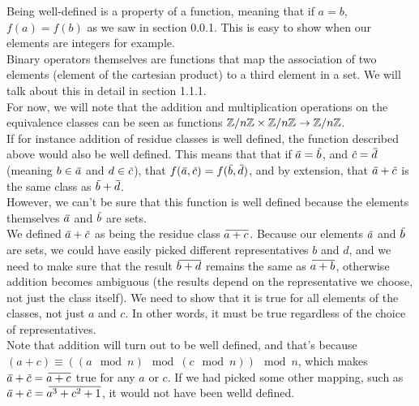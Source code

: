 \documentclass[12pt]{article}
\begin{document}
    Being well-defined is a property of a function,
    meaning that if $a = b$, $f(a) = f(b)$
    as we saw in section 0.0.1.
    This is easy to show when our elements are integers for example. \\
    Binary operators themselves are functions that
    map the association of two elements
    (element of the cartesian product) to a third element in a set.
    We will talk about this in detail in section 1.1.1. \\
    For now, we will note that the addition and multiplication
    operations on the equivalence classes can be seen as
    functions $\mathbb{Z}/n\mathbb{Z} \times \mathbb{Z}/n\mathbb{Z} \to \mathbb{Z}/n\mathbb{Z}$. \\
    If for instance addition of residue classes is well defined,
    the function described above would also be well defined.
    This means that that if $\,\overline{\!{a}} = \,\overline{\!{b}}$,
    and $\,\overline{\!{c}} = \,\overline{\!{d}}$
    (meaning $b \in \,\overline{\!{a}}$ and $d \in \,\overline{\!{c}}$),
    that $f(\,\overline{\!{a}}, \,\overline{\!{c}}) = f(\,\overline{\!{b}}, \,\overline{\!{d}})$,
    and by extension, that $\,\overline{\!{a}} + \,\overline{\!{c}}$
    is the same class as $\,\overline{\!{b}} + \,\overline{\!{d}}$. \\
    However, we can't be sure that this function is well defined
    because the elements themselves
    $\,\overline{\!{a}}$ and $\,\overline{\!{b}}$ are sets. \\
    We defined $\,\overline{\!{a}} + \,\overline{\!{c}}$
    as being the residue class $\,\overline{\!{a + c}}$.
    Because our elements $\,\overline{\!{a}}$ and $\,\overline{\!{b}}$ are sets,
    we could have easily picked different representatives
    $b$ and $d$,
    and we need to make sure that the result $\,\overline{\!{b + d}}$
    remains the same as $\,\overline{\!{a+b}}$,
    otherwise addition becomes ambiguous
    (the results depend on the representative we choose,
    not just the class itself).
    We need to show that it is true for all elements of the classes,
    not just $a$ and $c$.
    In other words, it must be true regardless
    of the choice of representatives. \\
    Note that addition will turn out to be well defined,
    and that's because
    $(a + c) \equiv ((a \mod n) \mod (c \mod n)) \mod n$,
    which makes $\,\overline{\!{a}} + \,\overline{\!{c}} = \,\overline{\!{a + c}}$
    true for any $a$ or $c$.
    If we had picked some other mapping,
    such as $\,\overline{\!{a}} + \,\overline{\!{c}} = \,\overline{\!{a^3 + c^2 + 1}}$,
    it would not have been welld defined. \\
\end{document}
